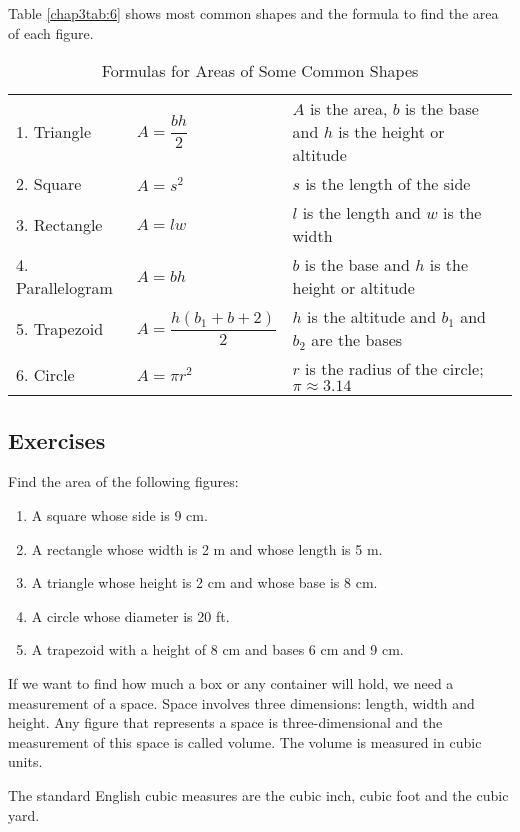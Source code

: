 Table \eqref{chap3tab:6} shows most common shapes and the formula to find the area of
each figure.

{\renewcommand{\arraystretch}{1.5}
\begin{table}[!h]
\centering
\caption{Formulas for Areas of Some Common Shapes}
\begin{tabularx}{\linewidth}{XXX}
\hline
\hline
1. Triangle & $A=\dfrac{bh}{2}$ & $A$ is the area, $b$ is the base
and $h$ is the height or
altitude\\
2. Square & $A=s^2$ & $s$ is the length of the side\\
3. Rectangle & $A=lw$ & $l$ is the length and $w$ is the
width\\
4. Parallelogram & $A=bh$ & $b$ is the base and $h$ is the
height or altitude\\
5. Trapezoid & $A=\dfrac{h(b_1+b+2)}{2}$ & $h$ is the altitude and $b_1$ and $b_2$ are the bases\\
6. Circle & $A=\pi r^2$ & $r$ is the radius of the circle; $\pi \approx 3.14$\\
\hline
\end{tabularx}
\label{chap3tab:6}
\end{table}}

\subsection*{Exercises}
Find the area of the following figures:
\begin{enumerate}
\item A square whose side is 9 cm.
\item A rectangle whose width is 2 m and whose length is 5 m.
\item A triangle whose height is 2 cm and whose base is 8 cm.
\item A circle whose diameter is 20 ft.
\item A trapezoid with a height of 8 cm and bases 6 cm and 9 cm.
\end{enumerate}

If we want to find how much a box or any container will hold, we need a
measurement of a space. Space involves three dimensions: length, width and height. Any
figure that represents a space is three-dimensional and the measurement of this space is
called volume. The volume is measured in cubic units.

The standard English cubic measures are the cubic inch, cubic foot and the cubic yard.


